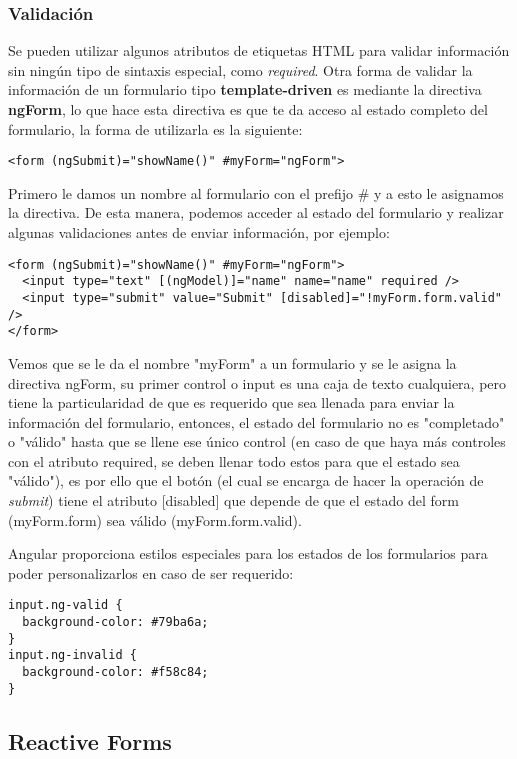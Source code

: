 \subsubsection{Validación}

Se pueden utilizar algunos atributos de etiquetas HTML para validar información sin ningún tipo de sintaxis especial, como \textit{required}. Otra forma de validar la información de un formulario tipo \textbf{template-driven} es mediante la directiva \textbf{ngForm}, lo que hace esta directiva es que te da acceso al estado completo del formulario, la forma de utilizarla es la siguiente:
\begin{lstlisting}[style=htmlcssjs]
<form (ngSubmit)="showName()" #myForm="ngForm">
\end{lstlisting}

Primero le damos un nombre al formulario con el prefijo \# y a esto le asignamos la directiva. De esta manera, podemos acceder al estado del formulario y realizar algunas validaciones antes de enviar información, por ejemplo:
\begin{lstlisting}[style=htmlcssjs]
<form (ngSubmit)="showName()" #myForm="ngForm">
  <input type="text" [(ngModel)]="name" name="name" required />
  <input type="submit" value="Submit" [disabled]="!myForm.form.valid" />
</form>
\end{lstlisting}

Vemos que se le da el nombre "myForm" a un formulario y se le asigna la directiva ngForm, su primer control o input es una caja de texto cualquiera, pero tiene la particularidad de que es requerido que sea llenada para enviar la información del formulario, entonces, el estado del formulario no es "completado" o "válido" hasta que se llene ese único control (en caso de que haya más controles con el atributo required, se deben llenar todo estos para que el estado sea "válido"), es por ello que el botón (el cual se encarga de hacer la operación de \textit{submit}) tiene el atributo [disabled] que depende de que el estado del form (myForm.form) sea válido (myForm.form.valid).

Angular proporciona estilos especiales para los estados de los formularios para poder personalizarlos en caso de ser requerido:
\begin{lstlisting}[style=htmlcssjs]
input.ng-valid {
  background-color: #79ba6a;
}
input.ng-invalid {
  background-color: #f58c84;
}
\end{lstlisting}


\subsection{Reactive Forms}

